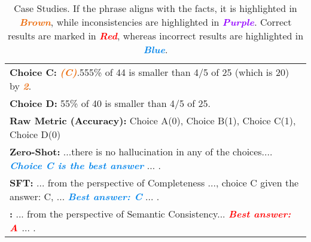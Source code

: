 \begin{table*}[t]
{\begin{tabular}{p{}}
\textbf{Choice C:} \textbf{\emph{\textcolor[HTML]{EB6500}{(C)}}}.555\% of 44 is smaller than 4/5 of 25 (which is 20) by \textbf{\emph{\textcolor[HTML]{EB6500}{2}}}.
\\
\textbf{Choice D:} 55\% of 40 is smaller than 4/5 of 25.\\ \hdashline
\textbf{Raw Metric (Accuracy):} Choice A(0), Choice B(1), Choice C(1), Choice D(0)\\
\textbf{Zero-Shot:} ...there is no hallucination in any of the choices.... 
\textbf{\emph{\textcolor[HTML]{0084EB}{ Choice C is the best answer}}} ... .\\
\textbf{SFT:} ... from the perspective of Completeness ..., choice C given the answer: C, ...
\textbf{\emph{\textcolor[HTML]{0084EB}{Best answer: C}}} ... .\\
\textbf{\method{}:} ... from the perspective of Semantic Consistency... \textbf{\emph{\textcolor{red}{Best answer: A }}} ... .\\
\hline
\end{tabular}}
\caption{Case Studies. If the phrase aligns with the facts, it is highlighted in \textbf{\emph{\textcolor[HTML]{EB6500}{Brown}}}, while inconsistencies are highlighted in \textbf{\emph{\textcolor[HTML]{9400FF}{Purple}}}. Correct results are marked in \textbf{\emph{\textcolor{red}{Red}}}, whereas incorrect results are highlighted in \textbf{\emph{\textcolor[HTML]{0084EB}{Blue}}}.}
\label{table1:casestudy}
\end{table*}